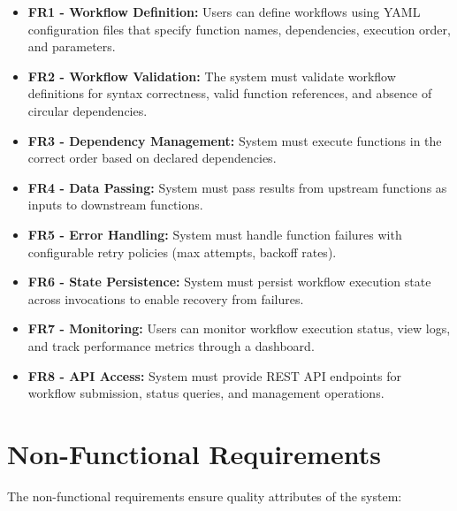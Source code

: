 \documentclass{fisatprojectfinal}
\begin{document}
\begin{itemize}
    \item \textbf{FR1 - Workflow Definition:} Users can define workflows using YAML configuration files that specify function names, dependencies, execution order, and parameters.
    
    \item \textbf{FR2 - Workflow Validation:} The system must validate workflow definitions for syntax correctness, valid function references, and absence of circular dependencies.
    
    \item \textbf{FR3 - Dependency Management:} System must execute functions in the correct order based on declared dependencies.
    
    \item \textbf{FR4 - Data Passing:} System must pass results from upstream functions as inputs to downstream functions.
    
    \item \textbf{FR5 - Error Handling:} System must handle function failures with configurable retry policies (max attempts, backoff rates).
    
    \item \textbf{FR6 - State Persistence:} System must persist workflow execution state across invocations to enable recovery from failures.
    
    \item \textbf{FR7 - Monitoring:} Users can monitor workflow execution status, view logs, and track performance metrics through a dashboard.
    
    \item \textbf{FR8 - API Access:} System must provide REST API endpoints for workflow submission, status queries, and management operations.
\end{itemize}

\section{Non-Functional Requirements}
The non-functional requirements ensure quality attributes of the system:
\end{document}
